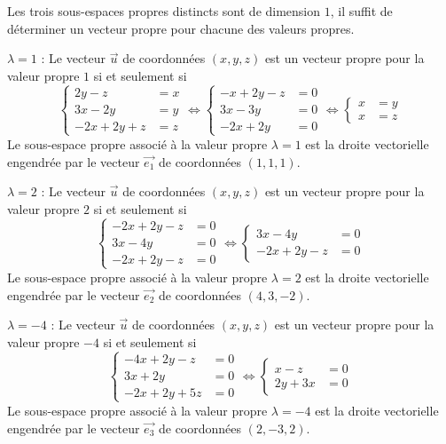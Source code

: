 {\begin{enumerate}
{Les trois sous-espaces propres distincts sont de dimension $1$, il suffit de d\'eterminer un vecteur propre pour
chacune des valeurs propres.

$\lambda=1$ : Le vecteur $\vec u$ de coordonn\'ees $(x,y,z)$ est un vecteur propre pour la valeur propre $1$
 si et seulement si 
$$\left\{\begin{align*}2y-z&=x \\  3x-2y&=y \\  -2x+2y+z&=z\end{align*}\right.\iff
\left\{\begin{align*}-x+2y-z&=0 \\  3x-3y&=0 \\  -2x+2y&=0\end{align*}\right.\iff
\left\{\begin{align*}x&=y \\  x&=z\end{align*}\right.$$
Le sous-espace propre associ\'e \`a la valeur propre $\lambda=1$ est la droite vectorielle engendr\'ee par 
le vecteur $\vec{e_1}$ de coordonn\'ees $(1,1,1)$.


$\lambda=2$ : Le vecteur $\vec u$ de coordonn\'ees $(x,y,z)$ est un vecteur propre pour la valeur propre $2$
 si et seulement si 
$$\left\{\begin{align*}-2x+2y-z&=0 \\  3x-4y&=0 \\  -2x+2y-z&=0\end{align*}\right.\iff
\left\{\begin{align*}3x-4y&=0 \\  -2x+2y-z&=0\end{align*}\right.$$
Le sous-espace propre associ\'e \`a la valeur propre $\lambda=2$ est la droite vectorielle engendr\'ee par 
le vecteur $\vec{e_2}$ de coordonn\'ees $(4,3,-2)$.


$\lambda=-4$ : Le vecteur $\vec u$ de coordonn\'ees $(x,y,z)$ est un vecteur propre pour la valeur propre $-4$
 si et seulement si 
$$\left\{\begin{align*}-4x+2y-z&=0 \\  3x+2y&=0 \\  -2x+2y+5z&=0\end{align*}\right.\iff
\left\{\begin{align*}x-z&=0 \\  2y+3x&=0\end{align*}\right.$$
Le sous-espace propre associ\'e \`a la valeur propre $\lambda=-4$ est la droite vectorielle engendr\'ee par 
le vecteur $\vec{e_3}$ de coordonn\'ees $(2,-3,2)$.

}
\end{enumerate}}
